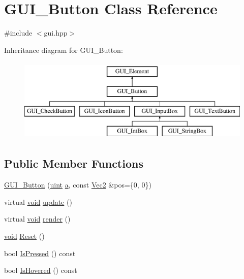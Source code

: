 \hypertarget{class_g_u_i___button}{\section{G\-U\-I\-\_\-\-Button Class Reference}
\label{class_g_u_i___button}
}


{\ttfamily \#include $<$gui.\-hpp$>$}

Inheritance diagram for G\-U\-I\-\_\-\-Button\-:\begin{figure}[H]
\begin{center}
\leavevmode
\includegraphics[height=4.000000cm]{class_g_u_i___button}
\end{center}
\end{figure}
\subsection*{Public Member Functions}
\begin{DoxyCompactItemize}
\item 
\hyperlink{class_g_u_i___button_a9cd30051f98c0c69fa8eec60799d4ce9}{G\-U\-I\-\_\-\-Button} (\hyperlink{common_8hpp_a69aa29b598b851b0640aa225a9e5d61d}{uint} \hyperlink{_s_d_l__opengl__glext_8h_a3309789fc188587d666cda5ece79cf82}{a}, const \hyperlink{class_vec2}{Vec2} \&pos=\{0, 0\})
\item 
virtual \hyperlink{_s_d_l__opengles2__gl2ext_8h_ae5d8fa23ad07c48bb609509eae494c95}{void} \hyperlink{class_g_u_i___button_af6077aeadc072ce43b58f011abc1f2e8}{update} ()
\item 
virtual \hyperlink{_s_d_l__opengles2__gl2ext_8h_ae5d8fa23ad07c48bb609509eae494c95}{void} \hyperlink{class_g_u_i___button_a4e9d35cd3b54d0888a86704f6c02f297}{render} ()
\item 
\hyperlink{_s_d_l__opengles2__gl2ext_8h_ae5d8fa23ad07c48bb609509eae494c95}{void} \hyperlink{class_g_u_i___button_ad1fc708e75351f2d754e89d4d8960a9f}{Reset} ()
\item 
bool \hyperlink{class_g_u_i___button_ab7170fbf07cb403832a8c49f3d2b0bdc}{Is\-Pressed} () const 
\item 
bool \hyperlink{class_g_u_i___button_a36e96c1d03a9d74ef583a9fa153d4051}{Is\-Hovered} () const 
\end{DoxyCompactItemize}
